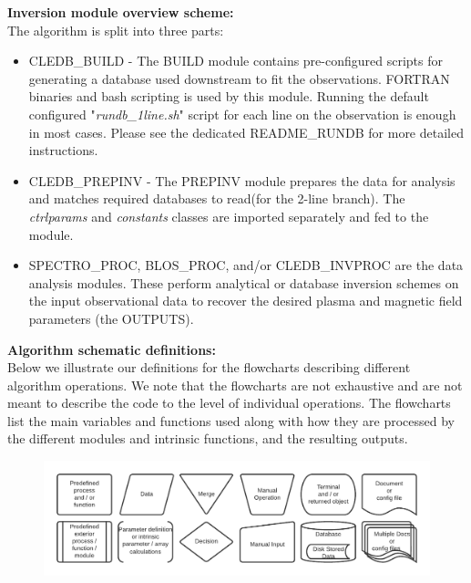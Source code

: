 \documentclass{article}
\begin{document}
\textbf{Inversion module overview scheme:\\} 
The algorithm is split into three parts: 
\begin{itemize} 
\item CLEDB\_BUILD - The BUILD module contains pre-configured scripts for generating a database used downstream to fit the observations. FORTRAN binaries and bash scripting is used by this module. Running the default configured "\emph{rundb\_1line.sh}" script for each line on the observation is enough in most cases. Please see the dedicated README\_RUNDB for more detailed instructions.
 
\item CLEDB\_PREPINV - The PREPINV module prepares the data for analysis and matches required databases to read(for the 2-line branch). The \emph{ctrlparams} and \emph{constants} classes are imported separately and fed to the module.

\item  SPECTRO\_PROC, BLOS\_PROC, and/or CLEDB\_INVPROC are the data analysis modules. These perform analytical or database inversion schemes on the input observational data to recover the desired plasma and magnetic field parameters (the OUTPUTS).
\end{itemize} 

\textbf{Algorithm schematic definitions:\\} 
Below we illustrate our definitions for the flowcharts describing different algorithm operations. We note that the flowcharts are not exhaustive and are not meant to describe the code to the level of individual operations. The flowcharts list the main variables and functions used along with how they are processed by the different modules and intrinsic functions, and the resulting outputs. 



\begin{figure}[!h]
 \hspace{-0.8cm}\includegraphics[width=1.08\columnwidth]{figs/shape_defs.pdf}
\end{figure} 
\end{document}
